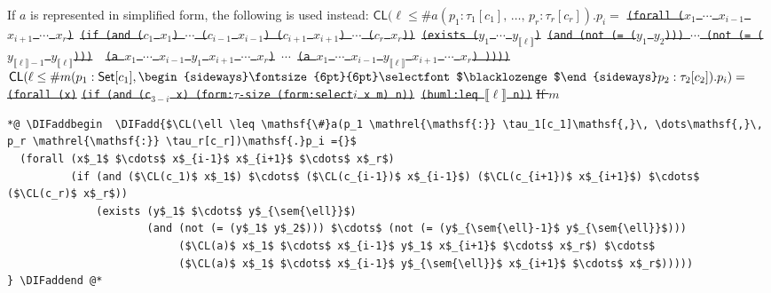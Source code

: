 \documentclass[10pt,fleqn,final]{scrreprt}
\newcommand*{\CL}{\ensuremath{\mathsf{CL}}\xspace}
\newcommand{\composition}{\raisebox{0.2pt}{\begin{sideways}\fontsize{6pt}{6pt}\selectfont$\blacklozenge$\end{sideways}}}
\newcommand{\sem}[1]{\mathopen\llbracket#1\mathclose\rrbracket}
\newcommand{\white}[1]{{\color{white}{#1}}}
\newcommand{\qqquad}{\white{x}\qquad}
\providecommand{\DIFadd}[1]{{\protect\color{blue}\uwave{#1}}} %
\providecommand{\DIFdel}[1]{{\protect\color{red}\sout{#1}}}                      %
\providecommand{\DIFaddbegin}{} %
\providecommand{\DIFaddend}{} %
\providecommand{\DIFdelbegin}{} %
\providecommand{\DIFdelend}{} %
\begin{document}
\noindent If $a$ is represented in simplified form, the following is used instead:
\DIFdelbegin %
\DIFdel{$\CL(\ell \leq \mathsf{\#}a(p_1 \mathrel{\mathsf{:}} \tau_1[c_1]\mathsf{,}\, \dots\mathsf{,}\, p_r \mathrel{\mathsf{:}} \tau_r[c_r])\mathsf{.}p_i=$}%
\texttt{\DIFdel{(forall ($x_1$ $\cdots$ $x_{i-1}$ $x_{i+1}$ $\cdots$ $x_r$)}%
\DIFdel{(if (and ($c_1$ $x_1$) $\cdots$ ($c_{i-1}$ $x_{i-1}$) ($c_{i+1}$ $x_{i+1}$) $\cdots$ ($c_r$ $x_r$))}%
\DIFdel{(exists ($y_1$ $\cdots$ $y_{\sem{\ell}}$)}%
\DIFdel{(and (not (= ($y_1$ $y_2$))) $\cdots$  (not (= ($y_{\sem{\ell}-1}$ $y_{\sem{\ell}}$))) }%
\DIFdel{(a $x_1$ $\cdots$ $x_{i-1}$ $y_1$ $x_{i+1}$ $\cdots$ $x_r$)}%
\DIFdel{$\cdots$}%
\DIFdel{(a $x_1$ $\cdots$ $x_{i-1}$ $y_{\sem{\ell}}$ $x_{i+1}$ $\cdots$ $x_r$) ))))}}
\DIFdel{$\CL(\ell \leq \mathsf{\#}m(p_1 \mathrel{\mathsf{:}} \mathsf{Set}[c_1]\mathsf{,}\, \composition p_2 \mathrel{\mathsf{:}} \tau_2[c_2])\mathsf{.}p_i)=$}%
\texttt{\DIFdel{(forall (x)}}%
\texttt{\DIFdel{(if (and (c$_{3-i}$ x) (form:$\tau$-size (form:select$i$ x m) n))}%
\DIFdel{(buml:leq $\sem{\ell}$ n))}}%
\DIFdel{If $m$ }\DIFdelend 
{}
\begin{lstlisting}[language=clif, mathescape]
*@ \DIFaddbegin  \DIFadd{$\CL(\ell \leq \mathsf{\#}a(p_1 \mathrel{\mathsf{:}} \tau_1[c_1]\mathsf{,}\, \dots\mathsf{,}\, p_r \mathrel{\mathsf{:}} \tau_r[c_r])\mathsf{.}p_i ={}$
  (forall (x$_1$ $\cdots$ x$_{i-1}$ x$_{i+1}$ $\cdots$ x$_r$)
          (if (and ($\CL(c_1)$ x$_1$) $\cdots$ ($\CL(c_{i-1})$ x$_{i-1}$) ($\CL(c_{i+1})$ x$_{i+1}$) $\cdots$ ($\CL(c_r)$ x$_r$))
              (exists (y$_1$ $\cdots$ y$_{\sem{\ell}}$)
                      (and (not (= (y$_1$ y$_2$))) $\cdots$ (not (= (y$_{\sem{\ell}-1}$ y$_{\sem{\ell}}$)))
                           ($\CL(a)$ x$_1$ $\cdots$ x$_{i-1}$ y$_1$ x$_{i+1}$ $\cdots$ x$_r$) $\cdots$
                           ($\CL(a)$ x$_1$ $\cdots$ x$_{i-1}$ y$_{\sem{\ell}}$ x$_{i+1}$ $\cdots$ x$_r$)))))
} \DIFaddend @*
\end{lstlisting}
\end{document}
